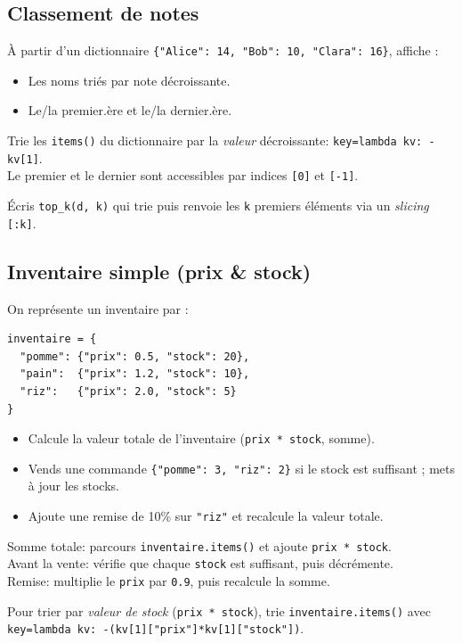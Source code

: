 \documentclass[11pt,a4paper]{article}
\begin{document}
\subsection*{Classement de notes}
À partir d'un dictionnaire \texttt{\{"Alice": 14, "Bob": 10, "Clara": 16\}}, affiche :
\begin{itemize}
    \item Les noms triés par note décroissante.
    \item Le/la premier.ère et le/la dernier.ère.
\end{itemize}
\begin{tcolorbox}[title=Aide]
Trie les \texttt{items()} du dictionnaire par la \emph{valeur} décroissante: \texttt{key=lambda kv: -kv[1]}.\\
Le premier et le dernier sont accessibles par indices \texttt{[0]} et \texttt{[-1]}.
\end{tcolorbox}
\begin{tcolorbox}[title=Bonus -- Aide]
Écris \texttt{top\_k(d, k)} qui trie puis renvoie les \texttt{k} premiers éléments via un \emph{slicing} \texttt{[:k]}.
\end{tcolorbox}


\subsection*{Inventaire simple (prix \& stock)}
On représente un inventaire par :
\begin{lstlisting}
inventaire = {
  "pomme": {"prix": 0.5, "stock": 20},
  "pain":  {"prix": 1.2, "stock": 10},
  "riz":   {"prix": 2.0, "stock": 5}
}
\end{lstlisting}
\begin{itemize}
    \item Calcule la valeur totale de l'inventaire (\texttt{prix * stock}, somme).
    \item Vends une commande \texttt{\{"pomme": 3, "riz": 2\}} si le stock est suffisant ; mets à jour les stocks.
    \item Ajoute une remise de 10\% sur \texttt{"riz"} et recalcule la valeur totale.
\end{itemize}
\begin{tcolorbox}[title=Aide]
Somme totale: parcours \texttt{inventaire.items()} et ajoute \texttt{prix * stock}.\\
Avant la vente: vérifie que chaque \texttt{stock} est suffisant, puis décrémente.\\
Remise: multiplie le \texttt{prix} par \texttt{0.9}, puis recalcule la somme.
\end{tcolorbox}
\begin{tcolorbox}[title=Bonus -- Aide]
Pour trier par \emph{valeur de stock} (\texttt{prix * stock}), trie \texttt{inventaire.items()} avec \texttt{key=lambda kv: -(kv[1]["prix"]*kv[1]["stock"])}.
\end{tcolorbox}
\end{document}
